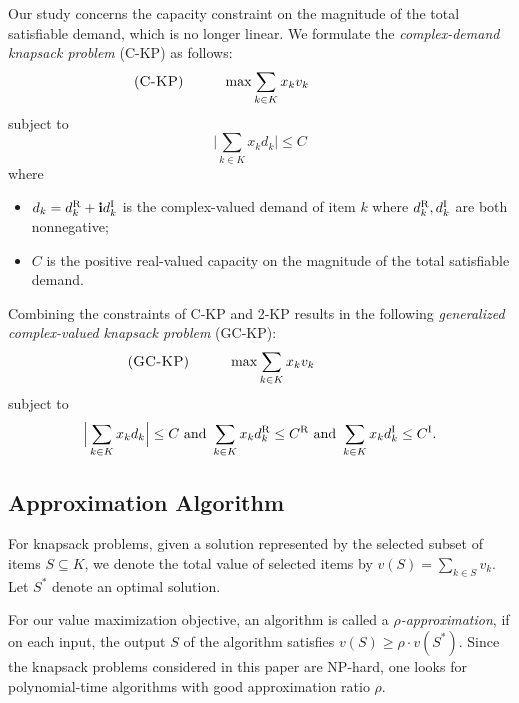 \documentclass{aamas2013}
\begin{document}
Our study concerns the capacity constraint on the magnitude of the total satisfiable demand, which is no longer linear.  We formulate the {\em complex-demand knapsack problem} ({\sc C-KP}) as follows: \begin{equation*}
\begin{array}{@{}lc} \hspace{-50pt}
\mbox{({\sc C-KP})} & \displaystyle \qquad \max \sum_{k \in K} x_k v_k \end{array}
\end{equation*}
subject to  \begin{equation*}
\Big|\sum_{k \in K} x_k d_k \Big| \le C \end{equation*}
where
\begin{itemize}

\item $d_k = d_k^{\rm R} + {\bf i} d_k^{\rm I}$ is the complex-valued demand of item $k$ where $d^{\rm R}_k, d^{\rm I}_k$ are both nonnegative;

\item $C$ is the positive real-valued capacity on the magnitude of the total satisfiable demand. 
\end{itemize}

Combining the constraints of C-KP and 2-KP results in the following {\em generalized complex-valued knapsack problem} ({\sc GC-KP}): \begin{equation*}
\begin{array}{@{}lc} \hspace{-50pt}
\mbox{({\sc GC-KP})} & \displaystyle \qquad \max \sum_{k \in K} x_k v_k \end{array}
\end{equation*}
subject to  \begin{equation*}
\Big|\sum_{k \in K} x_k d_k \Big| \le C \mbox{\ and\ } \sum_{k \in K} x_k d_k^{\rm R} \le C^{\rm R} \mbox{\ and\ } \sum_{k \in K} x_k d_k^{\rm I} \le C^{\rm I}.  
\end{equation*}

\subsection{Approximation Algorithm}
\noindent
For knapsack problems, given a solution represented by the selected subset of items $S\subseteq K$, we denote the total value of selected items by $v(S)=\sum_{k\in S}v_k$.  Let $S^\ast$ denote an optimal solution.

For our value maximization objective, an algorithm is called a {\em $\rho$-approximation}, if on each input, the output $S$ of the algorithm satisfies $v(S) \ge \rho \cdot v(S^\ast)$.   
Since the knapsack problems considered in this paper are NP-hard, one looks for polynomial-time algorithms with good approximation ratio $\rho$. 
\end{document}
